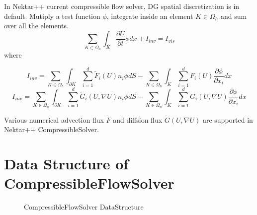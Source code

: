 In Nektar++ current compressible flow solver, DG spatial discretization is in default. Mutiply a test function $\phi$, integrate inside an element $K\in \Omega_{h}$ and sum over all the elements.
\begin{equation}
  \sum\limits_{K\in \Omega_{h}}{\int_{K}{\frac{\partial U}{\partial t}\phi dx}}+I_{inv}=I_{vis}
\end{equation}
where

$$I_{inv}= \sum\limits_{K\in \Omega_{h}}{\int_{\partial K}{\sum\limits_{i=1}^{d}{\widetilde{F}_{i}(U)n_{i}\phi}}dS}-
\sum\limits_{K\in \Omega_{h}}{\int_{K}{\sum\limits_{i=1}^{d}{F_{i}(U)\frac{\partial \phi}{\partial x_{i}}dx}}}$$
$$I_{inv}= \sum\limits_{K\in \Omega_{h}}{\int_{\partial K}{\sum\limits_{i=1}^{d}{\widetilde{G}_{i}(U,\nabla U)n_{i}\phi}}dS}-
\sum\limits_{K\in \Omega_{h}}{\int_{K}{\sum\limits_{i=1}^{d}{G_{i}(U,\nabla U)\frac{\partial \phi}{\partial x_{i}}dx}}}$$

Various numerical advection flux $\widetilde{F}$ and diffsion flux $\widetilde{G}(U,\nabla U)$ are supported in Nektar++ CompressibleSolver.
\clearpage
\section{Data Structure of CompressibleFlowSolver}
   \begin{figure}
          \caption{CompressibleFlowSolver DataStructure}
        \centering
        \begin{turn}{90}
        
        \end{turn}
    \end{figure}

\clearpage
